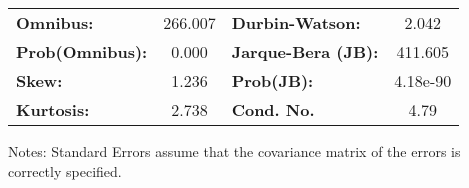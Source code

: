 \begin{center}
\begin{tabular}{lcccccc}
\bottomrule
\end{tabular}
\begin{tabular}{lclc}
\textbf{Omnibus:}       & 266.007 & \textbf{  Durbin-Watson:     } &    2.042  \\
\textbf{Prob(Omnibus):} &   0.000 & \textbf{  Jarque-Bera (JB):  } &  411.605  \\
\textbf{Skew:}          &   1.236 & \textbf{  Prob(JB):          } & 4.18e-90  \\
\textbf{Kurtosis:}      &   2.738 & \textbf{  Cond. No.          } &     4.79  \\
\bottomrule
\end{tabular}
\end{center}

Notes: \newline
 [1] Standard Errors assume that the covariance matrix of the errors is correctly specified.